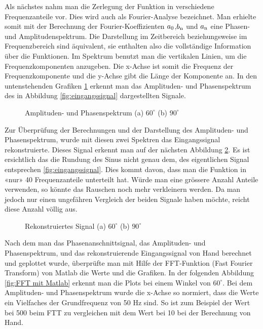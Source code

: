 Als nächstes nahm man die Zerlegung der Funktion in verschiedene Frequenzanteile vor. Dies wird auch als Fourier-Analyse bezeichnet. Man erhielte somit mit der Berechnung der Fourier-Koeffizienten $a\textsubscript{0}$,$b\textsubscript{n}$ und $a\textsubscript{n}$ eine Phasen- und Amplitudenspektrum. Die Darstellung im Zeitbereich beziehungsweise im Frequenzbereich sind äquivalent, sie enthalten also die vollständige Information über die Funktionen. Im Spektrum benutzt man die vertikalen Linien, um die Frequenzkomponenten anzugeben. Die x-Achse ist somit die Frequenz der Frequenzkomponente und die y-Achse gibt die Länge der Komponente an. In den untenstehenden Grafiken \ref{fig:Amplituden- und Phasenspektrum} erkennt man das Amplituden- und Phasenspektrum des in Abbildung \ref{fig:eingangssignal} dargestellten Signale.

\begin{figure}[h]
	\centering
	\qquad
	\caption{Amplituden- und Phasenspektrum (a) $60^\circ$ (b) $90^\circ$}
	\label{fig:Amplituden- und Phasenspektrum}
\end{figure} 

Zur Überprüfung der Berechnungen und der Darstellung des Amplituden- und Phasenspektrum, wurde mit diesen zwei Spektren das Eingangssignal rekonstruierte. Dieses Signal erkennt man auf der nächsten Abbildung \ref{fig:Rekonstruiertes Signal}. Es ist ersichtlich das die Rundung des Sinus nicht genau dem, des eigentlichen Signal entsprechen \ref{fig:eingangssignal}. Dies kommt davon, dass man die Funktion in «nur» 40 Frequenzanteile unterteilt hat. Würde man eine grössere Anzahl Anteile verwenden, so könnte das Rauschen noch mehr verkleinern werden. Da man jedoch nur einen ungefähren Vergleich der beiden Signale haben möchte, reicht diese Anzahl völlig aus. 

\begin{figure}[h]
	\centering
	\qquad
	\caption{Rekonstruiertes Signal (a) $60^\circ$ (b) $90^\circ$}
	\label{fig:Rekonstruiertes Signal}
\end{figure} 


Nach dem man das Phasenanschnittsignal, das Amplituden- und Phasenspektrum, und das rekonstruierende Eingangssignal von Hand berechnet und geplottet wurde, überprüfte man mit Hilfe der FFT-Funktion (Fast Fourier Transform) von Matlab die Werte und die Grafiken. In der folgenden Abbildung \ref{fig:FFT mit Matlab} erkennt man die Plots bei einem Winkel von $60^\circ$. Bei dem Amplituden- und Phasenspektrum wurde die x-Achse so normiert, dass die Werte ein Vielfaches der Grundfrequenz von 50 Hz sind. So ist zum Beispiel der Wert bei 500 beim FTT zu vergleichen mit dem Wert bei 10 bei der Berechnung von Hand.

